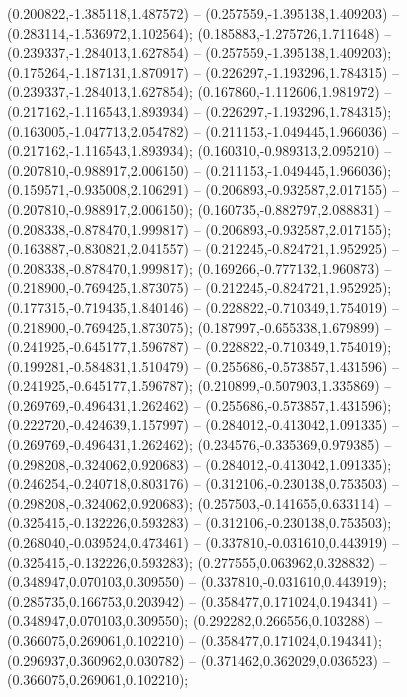  (0.200822,-1.385118,1.487572) -- (0.257559,-1.395138,1.409203) -- (0.283114,-1.536972,1.102564);
 (0.185883,-1.275726,1.711648) -- (0.239337,-1.284013,1.627854) -- (0.257559,-1.395138,1.409203);
 (0.175264,-1.187131,1.870917) -- (0.226297,-1.193296,1.784315) -- (0.239337,-1.284013,1.627854);
 (0.167860,-1.112606,1.981972) -- (0.217162,-1.116543,1.893934) -- (0.226297,-1.193296,1.784315);
 (0.163005,-1.047713,2.054782) -- (0.211153,-1.049445,1.966036) -- (0.217162,-1.116543,1.893934);
 (0.160310,-0.989313,2.095210) -- (0.207810,-0.988917,2.006150) -- (0.211153,-1.049445,1.966036);
 (0.159571,-0.935008,2.106291) -- (0.206893,-0.932587,2.017155) -- (0.207810,-0.988917,2.006150);
 (0.160735,-0.882797,2.088831) -- (0.208338,-0.878470,1.999817) -- (0.206893,-0.932587,2.017155);
 (0.163887,-0.830821,2.041557) -- (0.212245,-0.824721,1.952925) -- (0.208338,-0.878470,1.999817);
 (0.169266,-0.777132,1.960873) -- (0.218900,-0.769425,1.873075) -- (0.212245,-0.824721,1.952925);
 (0.177315,-0.719435,1.840146) -- (0.228822,-0.710349,1.754019) -- (0.218900,-0.769425,1.873075);
 (0.187997,-0.655338,1.679899) -- (0.241925,-0.645177,1.596787) -- (0.228822,-0.710349,1.754019);
 (0.199281,-0.584831,1.510479) -- (0.255686,-0.573857,1.431596) -- (0.241925,-0.645177,1.596787);
 (0.210899,-0.507903,1.335869) -- (0.269769,-0.496431,1.262462) -- (0.255686,-0.573857,1.431596);
 (0.222720,-0.424639,1.157997) -- (0.284012,-0.413042,1.091335) -- (0.269769,-0.496431,1.262462);
 (0.234576,-0.335369,0.979385) -- (0.298208,-0.324062,0.920683) -- (0.284012,-0.413042,1.091335);
 (0.246254,-0.240718,0.803176) -- (0.312106,-0.230138,0.753503) -- (0.298208,-0.324062,0.920683);
 (0.257503,-0.141655,0.633114) -- (0.325415,-0.132226,0.593283) -- (0.312106,-0.230138,0.753503);
 (0.268040,-0.039524,0.473461) -- (0.337810,-0.031610,0.443919) -- (0.325415,-0.132226,0.593283);
 (0.277555,0.063962,0.328832) -- (0.348947,0.070103,0.309550) -- (0.337810,-0.031610,0.443919);
 (0.285735,0.166753,0.203942) -- (0.358477,0.171024,0.194341) -- (0.348947,0.070103,0.309550);
 (0.292282,0.266556,0.103288) -- (0.366075,0.269061,0.102210) -- (0.358477,0.171024,0.194341);
 (0.296937,0.360962,0.030782) -- (0.371462,0.362029,0.036523) -- (0.366075,0.269061,0.102210);
